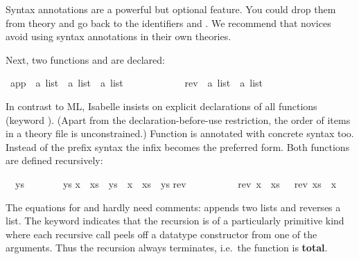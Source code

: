 \begin{isabellebody}
\begin{isamarkuptext}
\begin{warn}
  Syntax annotations are a powerful but optional feature. You
  could drop them from theory  and go back to the identifiers
   and .
  We recommend that novices avoid using
  syntax annotations in their own theories.
\end{warn}
Next, two functions  and  are declared:%
\end{isamarkuptext}%
\ app\ {\isacharcolon}{\isacharcolon}\ {\isachardoublequote}{\isacharprime}a\ list\ {\isasymRightarrow}\ {\isacharprime}a\ list\ {\isasymRightarrow}\ {\isacharprime}a\ list{\isachardoublequote}\ \ \ {\isacharparenleft}\ {\isachardoublequote}{\isacharat}{\isachardoublequote}\ {}{}{\isacharparenright}\isanewline
\ \ \ \ \ \ \ rev\ {\isacharcolon}{\isacharcolon}\ {\isachardoublequote}{\isacharprime}a\ list\ {\isasymRightarrow}\ {\isacharprime}a\ list{\isachardoublequote}%
\begin{isamarkuptext}%
\noindent
In contrast to ML, Isabelle insists on explicit declarations of all functions
(keyword ).  (Apart from the declaration-before-use
restriction, the order of items in a theory file is unconstrained.) Function
 is annotated with concrete syntax too. Instead of the
prefix syntax  the infix
 becomes the preferred
form. Both functions are defined recursively:%
\end{isamarkuptext}%
\isanewline
{\isachardoublequote}{\isacharbrackleft}{\isacharbrackright}\ {\isacharat}\ ys\ \ \ \ \ \ \ {\isacharequal}\ ys{\isachardoublequote}\isanewline
{\isachardoublequote}{\isacharparenleft}x\ {\isacharhash}\ xs{\isacharparenright}\ {\isacharat}\ ys\ {\isacharequal}\ x\ {\isacharhash}\ {\isacharparenleft}xs\ {\isacharat}\ ys{\isacharparenright}{\isachardoublequote}\isanewline
\isanewline
{}\isanewline
{\isachardoublequote}rev\ {\isacharbrackleft}{\isacharbrackright}\ \ \ \ \ \ \ \ {\isacharequal}\ {\isacharbrackleft}{\isacharbrackright}{\isachardoublequote}\isanewline
{\isachardoublequote}rev\ {\isacharparenleft}x\ {\isacharhash}\ xs{\isacharparenright}\ \ {\isacharequal}\ {\isacharparenleft}rev\ xs{\isacharparenright}\ {\isacharat}\ {\isacharparenleft}x\ {\isacharhash}\ {\isacharbrackleft}{\isacharbrackright}{\isacharparenright}{\isachardoublequote}%
\begin{isamarkuptext}%
\noindent
The equations for  and  hardly need comments:
 appends two lists and  reverses a list.  The
keyword  indicates that the recursion is
of a particularly primitive kind where each recursive call peels off a datatype
constructor from one of the arguments.  Thus the
recursion always terminates, i.e.\ the function is \textbf{total}.


\end{isamarkuptext}
\end{isabellebody}
